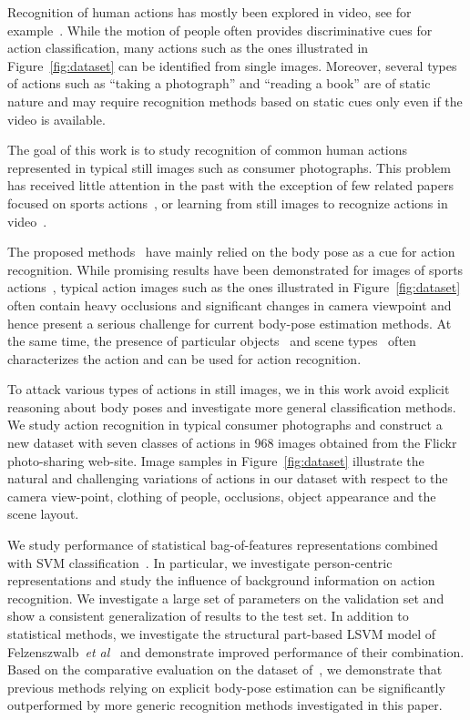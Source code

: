 \documentclass{bmvc2k}
\def\etal{\emph{et al}\bmvaOneDot}
\begin{document}
Recognition of human actions has mostly been explored in video, see for example~\cite{BoDa01,Laptev08,MHK06}. While the motion of people often provides discriminative cues for action classification, many actions such as the ones illustrated in Figure~\ref{fig:dataset} can be identified from single images. Moreover, several types of actions such as ``taking a photograph'' and ``reading a book'' are of static nature and may require recognition methods based on static cues only even if the video is available.

The goal of this work is to study recognition of common human actions represented in typical still images such as consumer photographs. This problem has received little attention in the past with the exception of few related
papers focused on sports actions~\cite{Gupta09,Ikizler08,Li07,Wang06}, or learning from still images to recognize actions in video~\cite{Ikizler09}. 

The proposed methods~\cite{Gupta09,Ikizler08,Wang06} have mainly relied on the body pose as a cue for action recognition. While promising results have been demonstrated for images of sports actions~\cite{Gupta09,Ikizler08,Wang06}, typical action images such as the ones illustrated in Figure~\ref{fig:dataset} often contain heavy occlusions and significant changes in camera viewpoint and hence present a serious challenge for current body-pose estimation methods. At the same time, the presence of particular objects~\cite{Gupta09} and scene types~\cite{Li07} often characterizes the action and can be used for action recognition.

To attack various types of actions in still images, we in this work avoid explicit reasoning about body poses and investigate more general classification methods. We study action recognition in typical consumer photographs and construct a new dataset with seven classes of actions in 968 images obtained from the Flickr photo-sharing web-site. Image samples in Figure~\ref{fig:dataset} illustrate the natural and challenging variations of actions in our dataset with respect to the camera view-point, clothing of people, occlusions, object appearance and the scene layout.

We study performance of statistical bag-of-features representations combined with SVM classification~\cite{Zhang07}. In particular, we investigate person-centric representations and study the influence of background information on action recognition. We investigate a large set of parameters on the validation set and show a consistent generalization of results to the test set. In addition to statistical methods, we investigate the structural part-based  LSVM model of Felzenszwalb~\etal~\cite{Felzenszwalb09} and demonstrate improved performance of their combination. Based on the comparative evaluation on the dataset of~\cite{Gupta09}, we demonstrate that previous methods relying on explicit body-pose estimation can be significantly outperformed by more generic recognition methods investigated in this paper.
\end{document}
